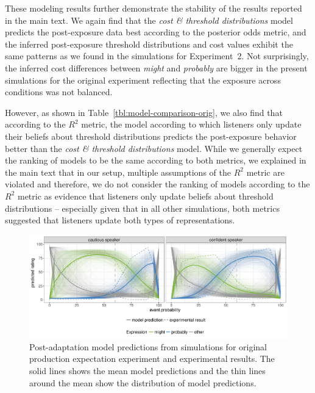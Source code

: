 These modeling results further demonstrate the stability of the results reported in the main text. We again find that the \textit{cost \& threshold distributions} model predicts the post-exposure data best according to the posterior odds metric, and the inferred post-exposure threshold distributions and cost values exhibit the same patterns as we found in the simulations for Experiment~2. Not surprisingly, the inferred cost differences between \textit{might} and \textit{probably} are bigger in the present simulations for the original experiment reflecting that the exposure across conditions was not balanced. 

However, as shown in Table~\ref{tbl:model-comparison-orig}, we also find that according to the $R^2$ metric, the model according to which listeners only update their beliefs about threshold distributions predicts the post-exposure
behavior better than the  \textit{cost \& threshold distributions} model. While we generally expect the ranking of models to be the same according to both metrics, we explained in the main text that in our setup, multiple assumptions
of the $R^2$ metric are violated and therefore, we do not consider the ranking of models according to the $R^2$ metric as evidence that listeners only update beliefs about threshold distributions -- especially given that in all other simulations, both metrics suggested that listeners update both types of representations.





\begin{figure}[h!]
  \includegraphics[width=\textwidth]{plots/fig-F1-adaptation-posterior-predictions.pdf}
  \caption{Post-adaptation model predictions from simulations for original production expectation experiment and experimental results. 
  The solid lines shows the mean model predictions and the thin lines around the mean show the distribution of model predictions. \label{fig:post-exposure-model-original}}
\end{figure}

